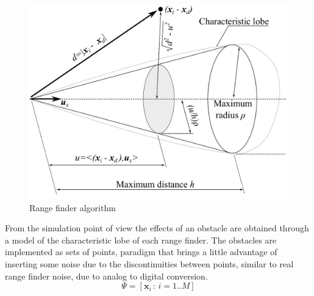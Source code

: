 \begin{figure}[h]
	\centering
	\includegraphics[scale=0.45]{ch3/img/lobe_dimensions.pdf}
	\caption{Range finder algorithm}
\end{figure}
From the simulation point of view the effects of an obstacle are obtained through a model of the characteristic lobe of each range finder. The obstacles are implemented as sets of points, paradigm that brings a little advantage of inserting some noise due to the discontinuities between points, similar to real range finder noise, due to analog to digital conversion.
\begin{equation}
\Psi = \left[ \mathbf{x}_i \,:\,i=1..M  \right]
\end{equation}

